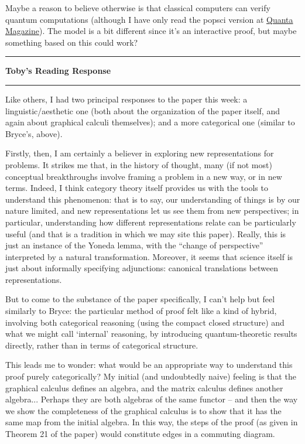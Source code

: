 \documentclass{amsart}
\newcommand{\iam}[1]{
  \vspace{0.25em}
  \hrule
  \vspace{0.25em}
  \textbf{{#1}'s Reading Response}
  \vspace{0.25em}
  \hrule
  \vspace{1em}
}
\begin{document}
Maybe a reason to believe otherwise is that classical
computers can verify quantum computations \cite{classicalverificationqc}
(although I have only read the popsci version at \href{https://www.quantamagazine.org/graduate-student-solves-quantum-verification-problem-20181008/}
{Quanta Magazine}).
The model is a bit different since it's an interactive proof, but maybe something based on this
could work?

\iam{Toby}

Like others, I had two principal responses to the paper this week: a
linguistic/aesthetic one (both about the organization of the paper
itself, and again about graphical calculi themselves); and a more
categorical one (similar to Bryce's, above).

Firstly, then, I am certainly a believer in exploring new
representations for problems. It strikes me that, in the history of
thought, many (if not most) conceptual breakthroughs involve framing a
problem in a new way, or in new terms. Indeed, I think category theory
itself provides us with the tools to understand this phenomenon: that
is to say, our understanding of things is by our nature limited, and
new representations let us see them from new perspectives; in
particular, understanding how different representations relate can be
particularly useful (and that is a tradition in which we may site this
paper). Really, this is just an instance of the Yoneda lemma, with the
``change of perspective'' interpreted by a natural
transformation. Moreover, it seems that science itself is just about
informally specifying adjunctions: canonical translations between
representations.

But to come to the substance of the paper specifically, I can't help
but feel similarly to Bryce: the particular method of proof felt like
a kind of hybrid, involving both categorical reasoning (using the
compact closed structure) and what we might call `internal' reasoning,
by introducing quantum-theoretic results directly, rather than in
terms of categorical structure.

This leads me to wonder: what would be an appropriate way to
understand this proof purely categorically? My initial (and
undoubtedly naive) feeling is that the graphical calculus defines an
algebra, and the matrix calculus defines another algebra... Perhaps
they are both algebras of the same functor -- and then the way we show
the completeness of the graphical calculus is to show that it has the
same map from the initial algebra. In this way, the steps of the proof
(as given in Theorem 21 of the paper) would constitute edges in a
commuting diagram.
\end{document}
